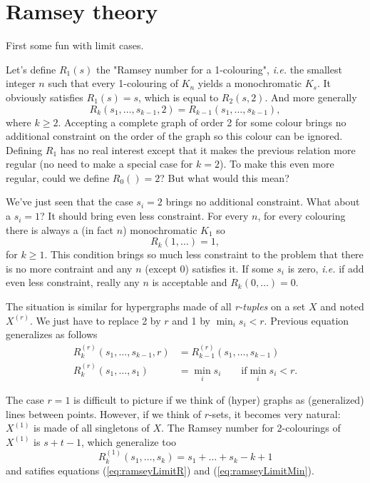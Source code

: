 \section{Ramsey theory}

First some fun with limit cases.

Let's define $R_1(s)$ the "Ramsey number for a 1-colouring",
\textit{i.e.} the smallest integer $n$ such that every 1-colouring of $K_n$ yields a monochromatic $K_s$.
It obviously satisfies $R_1(s) = s$, which is equal to $R_2(s,2)$. And more generally
\begin{equation}
    R_k(s_1,\dots,s_{k-1},2) = R_{k-1}(s_1,\dots,s_{k-1}) ,
\end{equation}
where $k \geq 2$. Accepting a complete graph of order 2 for some colour brings no additional constraint on the order of the graph so this colour can be ignored.
Defining $R_1$ has no real interest except that it makes the previous relation more regular (no need to make a special case for $k=2$).
To make this even more regular, could we define $R_0() = 2$? But what would this mean?

We've just seen that the case $s_i = 2$ brings no additional constraint. What about a $s_i = 1$? It should bring even less constraint.
For every $n$, for every colouring there is always a (in fact $n$) monochromatic $K_1$ so
\begin{equation}
    R_k(1,\dots)=1 ,
\end{equation}
for $k \geq 1$.
This condition brings so much less constraint to the problem that there is no more contraint and any $n$ (except 0) satisfies it.
If some $s_i$ is zero, \textit{i.e.} if add even less constraint, really any $n$ is acceptable and $R_k(0,\dots) = 0$.

The situation is similar for hypergraphs made of all \emph{r-tuples} on a set $X$ and noted $X^{(r)}$.
We just have to replace 2 by $r$ and 1 by $\min_i s_i < r$.
Previous equation generalizes as follows
\begin{align}
    \label{eq:ramseyLimitR}
    R_k^{(r)}(s_1,\dots,s_{k-1},r) & = R_{k-1}^{(r)}(s_1,\dots,s_{k-1}) \\
    \label{eq:ramseyLimitMin}
    R_k^{(r)}(s_1,\dots,s_1) & = \min_i s_i \qquad \text{if} \min_i s_i < r .
\end{align}

The case $r = 1$ is difficult to picture if we think of (hyper) graphs as (generalized) lines between points.
However, if we think of $r$-sets, it becomes very natural: $X^{(1)}$ is made of all singletons of $X$.
The Ramsey number for 2-colourings of $X^{(1)}$ is $s+t-1$, which generalize too
\begin{equation}
    \label{eq:ramseyLimitR1}
    R_k^{(1)}(s_1,\dots,s_k) = s_1 + \dots + s_k - k + 1
\end{equation}
and satifies equations (\ref{eq:ramseyLimitR}) and (\ref{eq:ramseyLimitMin}).

